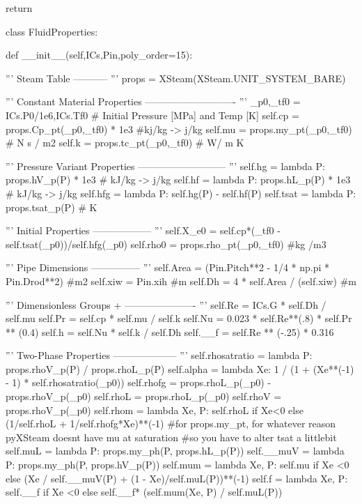 \documentclass{article}
\begin{document}
\begin{python}
        return

class FluidProperties:
    
    def __init__(self,ICs,Pin,poly_order=15):
        
        '''
        Steam Table
        -----------
        '''
        props = XSteam(XSteam.UNIT_SYSTEM_BARE)
        
        '''
        Constant Material Properties 
        ----------------------------
        '''
        _p0,_tf0 = ICs.P0/1e6,ICs.Tf0 # Initial Pressure [MPa] and Temp [K]
        self.cp = props.Cp_pt(_p0,_tf0) * 1e3 #kj/kg -> j/kg
        self.mu = props.my_pt(_p0,_tf0)  # N s / m2
        self.k = props.tc_pt(_p0,_tf0)  # W/ m K

        '''
        Pressure Variant Properties
        ---------------------------
        '''
        self.hg = lambda P: props.hV_p(P) * 1e3 # kJ/kg -> j/kg
        self.hf = lambda P: props.hL_p(P) * 1e3 # kJ/kg -> j/kg
        self.hfg = lambda P: self.hg(P) - self.hf(P)
        self.tsat = lambda P: props.tsat_p(P) # K

        '''
        Initial Properties
        ------------------
        '''
        self.X_e0 = self.cp*(_tf0 - self.tsat(_p0))/self.hfg(_p0)
        self.rho0 = props.rho_pt(_p0,_tf0) #kg /m3

        '''
        Pipe Dimensions
        ---------------
        '''
        self.Area = (Pin.Pitch**2 - 1/4 * np.pi * Pin.Drod**2) #m2
        self.xiw = Pin.xih #m
        self.Dh = 4 * self.Area / (self.xiw) #m
        
        '''
        Dimensionless Groups +
        ----------------------
        '''
        self.Re = ICs.G * self.Dh / self.mu
        self.Pr = self.cp * self.mu / self.k
        self.Nu = 0.023 * self.Re**(.8) * self.Pr ** (0.4)
        self.h = self.Nu * self.k / self.Dh 
        self.__f = self.Re ** (-.25) * 0.316

        '''
        Two-Phase Properties
        --------------------
        '''
        self.rhosatratio = lambda P: props.rhoV_p(P) / props.rhoL_p(P)
        self.alpha = lambda Xe: 1 / (1 + (Xe**(-1) - 1) * self.rhosatratio(_p0))
        self.rhofg = props.rhoL_p(_p0) - props.rhoV_p(_p0)
        self.rhoL = props.rhoL_p(_p0)
        self.rhoV = props.rhoV_p(_p0)
        self.rhom = lambda Xe, P: self.rhoL if Xe<0 else (1/self.rhoL + 1/self.rhofg*Xe)**(-1)
            #for props.my_pt, for whatever reason pyXSteam doesnt have mu at saturation
            #so you have to alter tsat a littlebit
        self.muL = lambda P: props.my_ph(P, props.hL_p(P))
        self.__muV = lambda P: props.my_ph(P, props.hV_p(P))
        self.mum = lambda Xe, P: self.mu if Xe <0 else (Xe / self.__muV(P) + (1 - Xe)/self.muL(P))**(-1)
        self.f = lambda Xe, P: self.__f if Xe <0 else self.__f* (self.mum(Xe, P) / self.muL(P))



\end{python}
\end{document}
